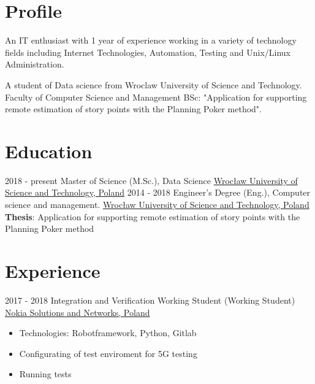 \documentclass[letterpaper]{tenseconds} %
\begin{document}
\makeprofile %

\section{Profile}
\textnormal{\faInfo} An IT enthusiast with 1 year of experience working in a variety of technology fields including Internet Technologies, Automation, Testing and Unix/Linux Administration.

\textnormal{\faGraduationCap} A student of Data science from Wroclaw University of Science and Technology. Faculty of Computer Science and Management BSc: "Application for supporting remote estimation of
story points with the Planning Poker method". \vspace{2mm}

\section{Education}
\begin{twenty} %
	\twentyitem
	{2018 - present}
	{}
	{Master of Science (M.Sc.), Data Science}
	{\href{https://pwr.edu.pl/}{Wrocław University of Science and Technology, Poland}}
	{}
	{}
	\twentyitem
	{2014 - 2018}
	{}
	{Engineer's Degree (Eng.), Computer science and management.}
	{\href{https://pwr.edu.pl/}{Wrocław University of Science and Technology, Poland}}
	{}
	{
	\textbf{Thesis}:  Application for supporting remote estimation of story points with the Planning Poker method
	}
	{}
	{}
\end{twenty}

\section{Experience}
\begin{twenty} %
	\twentyitem
	{2017 - 2018}
	{}
	{Integration and Verification Working Student \textnormal{(Working Student)}}
	{\href{https://nokiawroclaw.pl/}{Nokia Solutions and Networks, Poland}}
	{}
	{\begin{itemize}
		\item Technologies: Robotframework, Python, Gitlab
		\item Configurating of test enviroment for 5G testing
		\item Running tests
	\end{itemize}}
\end{twenty}
\end{document}
